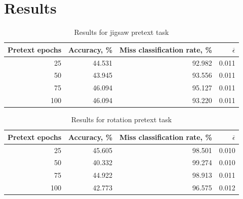 \section{Results}

\begin{table}[h]
    \begin{tabular}{|r|r|r|r|}
        \hline
        Pretext epochs & Accuracy, \%              & Miss classification rate, \% & $\overline{\epsilon}$ \\
        \hline
        25             & 44.531                    & \cellcolor{yellow} 92.982    & 0.011                 \\
        50             & 43.945                    & 93.556                       & 0.011                 \\
        75             & \cellcolor{yellow} 46.094 & 95.127                       & 0.011                 \\
        100            & 46.094                    & 93.220                       & 0.011                 \\
        \hline
    \end{tabular}
    \caption{\label{tab:table-1}Results for jigsaw pretext task}
\end{table}



\begin{table}[h]
    \begin{tabular}{|r|r|r|r|}
        \hline
        Pretext epochs & Accuracy, \%              & Miss classification rate, \% & $\overline{\epsilon}$    \\
        \hline
        25             & \cellcolor{yellow} 45.605 & 98.501                       & 0.010                    \\
        50             & 40.332                    & 99.274                       & 0.010                    \\
        75             & 44.922                    & 98.913                       & 0.011                    \\
        100            & 42.773                    & \cellcolor{yellow} 96.575    & \cellcolor{yellow} 0.012 \\
        \hline
    \end{tabular}
    \caption{\label{tab:table-2}Results for rotation pretext task}
\end{table}

